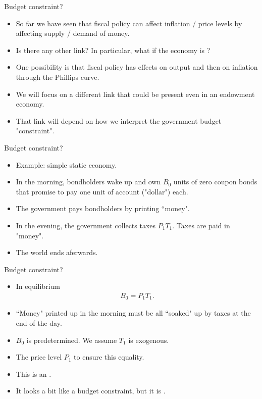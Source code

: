 \documentclass[11pt,xcolor={dvipsnames},aspectratio=159,hyperref={pdftex,pdfpagemode=UseNone,hidelinks,pdfdisplaydoctitle=true},usepdftitle=false]{beamer}
\begin{document}
\begin{frame}{Budget constraint?}
    \begin{itemize}
            \item So far we have seen that fiscal policy can affect inflation / price levels by affecting supply / demand of money. 
            \item Is there any other link? In particular, what if the economy is ?
            \item One possibility is that fiscal policy has effects on output and then on inflation through the Phillips curve.
            \item We will focus on a different link that could be present even in an endowment economy.
            \item That link will depend on how we interpret the government budget "constraint".
        \end{itemize}
    \end{frame}

\begin{frame}{Budget constraint?}
    \begin{itemize}
            \item Example: simple static economy.
            \item In the morning, bondholders wake up and own $B_0$ units of zero coupon bonds that promise to pay one unit of account ("dollar") each. 
            \item The government pays bondholders by printing ``money".
            \item In the evening, the government collects taxes $P_1 T_1$. Taxes are paid in "money". 
            \item The world ends aferwards.
        \end{itemize}
    \end{frame}

\begin{frame}{Budget constraint?}
    \begin{itemize}
            \item In equilibrium \begin{align*}
                B_0 = P_1 T_1.
            \end{align*}
            \item  ``Money" printed up in the morning must be all ``soaked" up by taxes at the end of the day.
            \item $B_0$ is predetermined. We assume $T_1$ is exogenous. 
            \item The price level $P_1$ to ensure this equality.
            \item This is an .
            \item It looks a bit like a budget constraint, but it is .
        \end{itemize}
    \end{frame}
\end{document}

